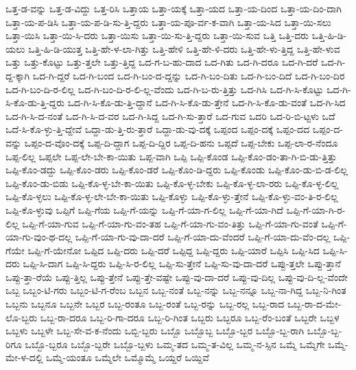 {ಒತ್ತ-ಡ-ವನ್ನು
ಒತ್ತ-ಡ-ವಿದ್ದು
ಒತ್ತ-ರಿಸಿ
ಒತ್ತಾಯ
ಒತ್ತಾ-ಯಕ್ಕೆ
ಒತ್ತಾ-ಯದ
ಒತ್ತಾ-ಯ-ದಿಂದ
ಒತ್ತಾ-ಯ-ದಿಂ-ದಾಗಿ
ಒತ್ತಾ-ಯ-ಪ-ಡಿಸಿ
ಒತ್ತಾ-ಯ-ಪ-ಡಿ-ಸು-ತ್ತಿ-ದ್ದರು
ಒತ್ತಾ-ಯ-ಪೂ-ರ್ವ-ಕ-ವಾಗಿ
ಒತ್ತಾ-ಯ-ಸಿದ
ಒತ್ತಾ-ಯಿ-ಸಲು
ಒತ್ತಾ-ಯಿಸಿ
ಒತ್ತಾ-ಯಿ-ಸಿ-ದರು
ಒತ್ತಾ-ಯಿಸು
ಒತ್ತಾ-ಯಿ-ಸು-ತ್ತಿ-ದ್ದರು
ಒತ್ತಾ-ಯಿ-ಸುವ
ಒತ್ತಿ
ಒತ್ತಿ-ದರು
ಒತ್ತಿ-ಹಿ-ಡಿ-ಯಲು
ಒತ್ತಿ-ಹಿ-ಡಿ-ಯುತ್ತ
ಒತ್ತಿ-ಹೇ-ಳ-ಲಾ-ಗಿತ್ತು
ಒತ್ತಿ-ಹೇಳಿ
ಒತ್ತಿ-ಹೇ-ಳಿ-ದರು
ಒತ್ತಿ-ಹೇ-ಳು-ತ್ತಿದ್ದ
ಒತ್ತಿ-ಹೇ-ಳುವ
ಒತ್ತು
ಒತ್ತು-ಕೊಟ್ಟು
ಒತ್ತು-ತ್ತಲೇ
ಒತ್ತು-ತ್ತಿದ್ದ
ಒದ-ಗ-ಬ-ಹು-ದಾದ
ಒದ-ಗಿತು
ಒದ-ಗಿ-ದರೂ
ಒದ-ಗಿ-ದರೆ
ಒದ-ಗಿ-ದ್ದ-ಕ್ಕಾಗಿ
ಒದ-ಗಿ-ದ್ದರೆ
ಒದ-ಗಿ-ಬಂದ
ಒದ-ಗಿ-ಬಂ-ದ-ದ್ದನ್ನು
ಒದ-ಗಿ-ಬಂ-ದಿತು
ಒದ-ಗಿ-ಬಂ-ದಿದೆ
ಒದ-ಗಿ-ಬಂ-ದಿರ
ಒದ-ಗಿ-ಬಂ-ದಿ-ರ-ಲಿಲ್ಲ
ಒದ-ಗಿ-ಬಂ-ದಿ-ರ-ಲಿ-ಲ್ಲ-ವೆಂದು
ಒದ-ಗಿ-ಬ-ರು-ತ್ತಿತ್ತು
ಒದ-ಗಿಸಿ
ಒದ-ಗಿ-ಸಿ-ಕೊಟ್ಟು
ಒದ-ಗಿ-ಸಿ-ಕೊ-ಡು-ತ್ತಿ-ದ್ದರು
ಒದ-ಗಿ-ಸಿ-ಕೊ-ಡು-ತ್ತಿ-ದ್ದಾನೆ
ಒದ-ಗಿ-ಸಿ-ಕೊ-ಡು-ತ್ತೇನೆ
ಒದ-ಗಿ-ಸಿ-ಕೊ-ಡು-ವಂತೆ
ಒದ-ಗಿ-ಸಿದ
ಒದ-ಗಿ-ಸಿ-ದ-ನಂತೆ
ಒದ-ಗಿ-ಸಿ-ದ-ವರ
ಒದ-ಗಿ-ಸಿದ್ದ
ಒದ-ಗಿ-ಸು-ತ್ತಾರೆ
ಒದ-ಗುವ
ಒದರಿ
ಒದ-ರಿ-ಬಿ-ಟ್ಟಳು
ಒದೆ
ಒದೆ-ಸಿ-ಕೊ-ಳ್ಳು-ತ್ತಿ-ದ್ದೇವೆ
ಒದ್ದಾ-ಡು-ತ್ತಿ-ರು-ತ್ತಾರೆ
ಒದ್ದಾ-ಡು-ವು-ದಕ್ಕೆ
ಒಪ್ಪಂದ
ಒಪ್ಪಂ-ದಕ್ಕೆ
ಒಪ್ಪಂ-ದದ
ಒಪ್ಪಂ-ದ-ವನ್ನು
ಒಪ್ಪಂ-ದ-ವೊಂ-ದಕ್ಕೆ
ಒಪ್ಪ-ದಿ-ದ್ದಾಗ
ಒಪ್ಪ-ದಿ-ದ್ದಿರ
ಒಪ್ಪ-ದಿ-ಹನು
ಒಪ್ಪದೆ
ಒಪ್ಪ-ಬೇಕು
ಒಪ್ಪ-ಲಾ-ರ-ನೆಂದೂ
ಒಪ್ಪ-ಲಿಲ್ಲ
ಒಪ್ಪಲೇ
ಒಪ್ಪ-ಲೇ-ಬೇ-ಕಾ-ಯಿತು
ಒಪ್ಪ-ವಾಗಿ
ಒಪ್ಪಿ
ಒಪ್ಪಿ-ಕೊಂಡ
ಒಪ್ಪಿ-ಕೊಂ-ಡಂ-ತಾ-ಗಿ-ಬಿ-ಡು-ತ್ತಿತ್ತು
ಒಪ್ಪಿ-ಕೊಂ-ಡದ್ದು
ಒಪ್ಪಿ-ಕೊಂ-ಡರು
ಒಪ್ಪಿ-ಕೊಂ-ಡರೆ
ಒಪ್ಪಿ-ಕೊಂ-ಡಿ-ದ್ದರು
ಒಪ್ಪಿ-ಕೊಂಡು
ಒಪ್ಪಿ-ಕೊಂ-ಡು-ಬಿ-ಡ-ಲಿಲ್ಲ
ಒಪ್ಪಿ-ಕೊಂ-ಡು-ಬಿಡು
ಒಪ್ಪಿ-ಕೊ-ಳ್ಳ-ಬೇ-ಕಾ-ಯಿತು
ಒಪ್ಪಿ-ಕೊ-ಳ್ಳ-ಬೇಕು
ಒಪ್ಪಿ-ಕೊ-ಳ್ಳ-ಲಾ-ರರು
ಒಪ್ಪಿ-ಕೊ-ಳ್ಳ-ಲಿಲ್ಲ
ಒಪ್ಪಿ-ಕೊ-ಳ್ಳಲು
ಒಪ್ಪಿ-ಕೊ-ಳ್ಳ-ಲೇ-ಬೇ-ಕಾ-ಯಿತು
ಒಪ್ಪಿ-ಕೊಳ್ಳು
ಒಪ್ಪಿ-ಕೊ-ಳ್ಳು-ತ್ತೇನೆ
ಒಪ್ಪಿ-ಕೊ-ಳ್ಳು-ವಂ-ತಿ-ರ-ಲಿಲ್ಲ
ಒಪ್ಪಿ-ಕೊ-ಳ್ಳುವು
ಒಪ್ಪಿಗೆ
ಒಪ್ಪಿ-ಗೆಯ
ಒಪ್ಪಿ-ಗೆ-ಯನ್ನು
ಒಪ್ಪಿ-ಗೆ-ಯಾ-ಗ-ಲಿಲ್ಲ
ಒಪ್ಪಿ-ಗೆ-ಯಾ-ಗಿದೆ
ಒಪ್ಪಿ-ಗೆ-ಯಾ-ಗಿ-ರ-ಲಿಲ್ಲ
ಒಪ್ಪಿ-ಗೆ-ಯಾ-ಗುವ
ಒಪ್ಪಿ-ಗೆ-ಯಾ-ಗು-ವಂ-ತಹ
ಒಪ್ಪಿ-ಗೆ-ಯಾ-ಗು-ವಂ-ತಿತ್ತು
ಒಪ್ಪಿ-ಗೆ-ಯಾ-ಗು-ವಂತೆ
ಒಪ್ಪಿ-ಗೆ-ಯಾ-ಗು-ವುಂ-ಥ-ದಲ್ಲ
ಒಪ್ಪಿ-ಗೆ-ಯಾ-ಗು-ವು-ದಾ-ದರೆ
ಒಪ್ಪಿ-ಗೆ-ಯಾ-ದು-ವೆಂದರೆ
ಒಪ್ಪಿ-ಗೆ-ಯಾ-ದು-ವೆಂ-ದಲ್ಲ
ಒಪ್ಪಿ-ಗೆಯೇ
ಒಪ್ಪಿ-ಗೆ-ಯೇನೋ
ಒಪ್ಪಿದ
ಒಪ್ಪಿ-ದರು
ಒಪ್ಪಿ-ದರೆ
ಒಪ್ಪಿದ್ದ
ಒಪ್ಪಿ-ದ್ದರು
ಒಪ್ಪಿ-ಯಾರೆ
ಒಪ್ಪಿಸಿ
ಒಪ್ಪಿ-ಸಿದ
ಒಪ್ಪಿ-ಸಿ-ದರು
ಒಪ್ಪಿ-ಸಿ-ದಾಗ
ಒಪ್ಪಿ-ಸಿ-ದ್ದರು
ಒಪ್ಪಿ-ಸಿ-ರ-ಲಿಲ್ಲ
ಒಪ್ಪಿ-ಸು-ತ್ತೇನೆ
ಒಪ್ಪಿ-ಸು-ವು-ದಾ-ದರೆ
ಒಪ್ಪು-ತ್ತಲೇ
ಒಪ್ಪು-ತ್ತಾನೆ
ಒಪ್ಪು-ತ್ತಾ-ರೆಯೆ
ಒಪ್ಪು-ತ್ತಿಲ್ಲ
ಒಪ್ಪು-ತ್ತೇನೆ
ಒಪ್ಪು-ತ್ತೇ-ವಷ್ಟೇ
ಒಪ್ಪು-ವು-ದಾ-ದರೆ
ಒಪ್ಪು-ವು-ದಿಲ್ಲ
ಒಪ್ಪು-ವು-ದಿ-ಲ್ಲ-ವೆಂದೇ
ಒಬ್ಬ
ಒಬ್ಬಂ-ಟಿ-ಗರು
ಒಬ್ಬಂ-ಟಿ-ಗ-ರೆಂಬ
ಒಬ್ಬನ
ಒಬ್ಬ-ನಂತೆ
ಒಬ್ಬ-ನನ್ನು
ಒಬ್ಬ-ನನ್ನೂ
ಒಬ್ಬ-ನಾ-ಗಿದ್ದ
ಒಬ್ಬ-ನಿ-ಗಿಂತ
ಒಬ್ಬನು
ಒಬ್ಬನೂ
ಒಬ್ಬನೇ
ಒಬ್ಬರ
ಒಬ್ಬ-ರಂತೂ
ಒಬ್ಬ-ರಂತೆ
ಒಬ್ಬ-ರನ್ನು
ಒಬ್ಬ-ರಲ್ಲ
ಒಬ್ಬ-ರಾದ
ಒಬ್ಬ-ರಾ-ದ-ಮೇ-ಲೊ-ಬ್ಬರು
ಒಬ್ಬ-ರಾ-ದರೂ
ಒಬ್ಬ-ರಿ-ಗಾ-ದರೂ
ಒಬ್ಬ-ರಿ-ಗಿಂತ
ಒಬ್ಬರು
ಒಬ್ಬರೂ
ಒಬ್ಬ-ರೆಂ-ಬಂತೆ
ಒಬ್ಬರೇ
ಒಬ್ಬಳ
ಒಬ್ಬಳು
ಒಬ್ಬಳೇ
ಒಬ್ಬ-ಸೇ-ವ-ಕ-ನೆಂದು
ಒಬ್ಬಿ-ಬ್ಬರು
ಒಬ್ಬೊ
ಒಬ್ಬೊಬ್ಬ
ಒಬ್ಬೊ-ಬ್ಬರ
ಒಬ್ಬೊ-ಬ್ಬ-ರಾಗಿ
ಒಬ್ಬೊ-ಬ್ಬ-ರಿಗೂ
ಒಬ್ಬೊ-ಬ್ಬರೂ
ಒಬ್ಬೊ-ಬ್ಬರೇ
ಒಬ್ಬೊ-ಬ್ಬಳು
ಒಮ್ಮ-ತದ
ಒಮ್ಮ-ತ-ವಿಲ್ಲ
ಒಮ್ಮ-ನ-ಸ್ಸಿನ
ಒಮ್ಮೆ
ಒಮ್ಮೆಗೇ
ಒಮ್ಮೆ-ಮೇ-ಳ-ದಲ್ಲಿ
ಒಮ್ಮೆ-ಯಂತೂ
ಒಮ್ಮೆಲೇ
ಒಮ್ಮೊಮ್ಮೆ
ಒಯ್ದರೆ
ಒಯ್ದಿವೆ
}
